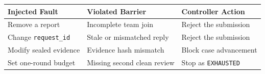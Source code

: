 \begin{tabular}{@{}P{3.0cm}P{4.6cm}P{4.9cm}@{}}
\toprule
\textbf{Injected Fault} & \textbf{Violated Barrier} & \textbf{Controller Action} \\
\midrule
Remove a report & Incomplete team join & Reject the submission \\
Change \texttt{request\_id} & Stale or mismatched reply & Reject the submission \\
Modify sealed evidence & Evidence hash mismatch & Block case advancement \\
Set one-round budget & Missing second clean review & Stop as \texttt{EXHAUSTED} \\
\bottomrule
\end{tabular}
